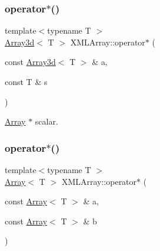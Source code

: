 \mbox{\label{namespaceXMLArray_a6e9dd6864853158f18b5f406e398c570}} 
\subsubsection{\texorpdfstring{operator$\ast$()}{operator*()}\hspace{0.1cm}{\footnotesize\ttfamily [2/5]}}
{\footnotesize\ttfamily template$<$typename T $>$ \\
\mbox{\hyperlink{classXMLArray_1_1Array3d}{Array3d}}$<$ T $>$ X\+M\+L\+Array\+::operator$\ast$ (\begin{DoxyParamCaption}\item[{const \mbox{\hyperlink{classXMLArray_1_1Array3d}{Array3d}}$<$ T $>$ \&}]{a,  }\item[{const T \&}]{s }\end{DoxyParamCaption})\hspace{0.3cm}{\ttfamily [inline]}}



\mbox{\hyperlink{classXMLArray_1_1Array}{Array}} $\ast$ scalar. 

\mbox{\label{namespaceXMLArray_ac9f5d1fb8f1862f3d57ddf2745f55b62}} 
\subsubsection{\texorpdfstring{operator$\ast$()}{operator*()}\hspace{0.1cm}{\footnotesize\ttfamily [3/5]}}
{\footnotesize\ttfamily template$<$typename T $>$ \\
\mbox{\hyperlink{classXMLArray_1_1Array}{Array}}$<$ T $>$ X\+M\+L\+Array\+::operator$\ast$ (\begin{DoxyParamCaption}\item[{const \mbox{\hyperlink{classXMLArray_1_1Array}{Array}}$<$ T $>$ \&}]{a,  }\item[{const \mbox{\hyperlink{classXMLArray_1_1Array}{Array}}$<$ T $>$ \&}]{b }\end{DoxyParamCaption})\hspace{0.3cm}{\ttfamily [inline]}}



